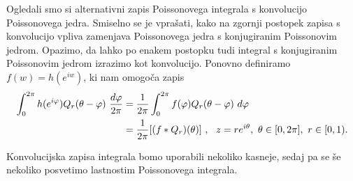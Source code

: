 \documentclass[mat1, tisk]{fmfdelo}
\begin{document}
    Ogledali smo si alternativni zapis Poissonovega integrala s konvolucijo Poissonovega jedra. Smiselno se je vprašati, kako na zgornji postopek zapisa s konvolucijo vpliva zamenjava Poissonovega jedra s konjugiranim Poissonovim jedrom. Opazimo, da lahko po enakem postopku tudi integral s konjugiranim Poissonovim jedrom izrazimo kot konvolucijo. 
    Ponovno definiramo $f(w) = h(e^{i w})$, ki nam omogoča zapis
    \begin{align}
        \label{konv_Qr}
        \int_{0}^{2\pi}{h(e^{i\varphi}) Q_r(\theta - \varphi)~\frac{d\varphi}{2 \pi}}  &= \frac{1}{2\pi}\int_{0}^{2 \pi}{f(\varphi) Q_r(\theta - \varphi)~d\varphi} \\ 
        &= \frac{1}{2 \pi}[(f * Q_r)(\theta)]~,~~z = r e^{i\theta},~\theta \in [0,2\pi],~r\in[0,1). \notag
    \end{align}
    
    Konvolucijska zapisa integrala bomo uporabili nekoliko kasneje, sedaj pa se še nekoliko posvetimo lastnostim Poissonovega integrala.
\end{document}
